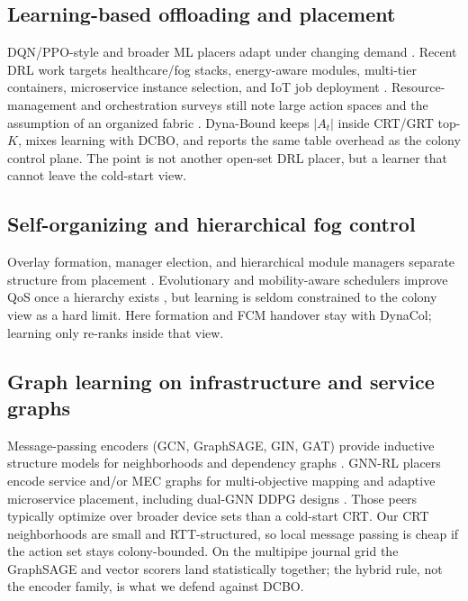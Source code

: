 \documentclass[pdflatex,sn-mathphys-num,iicol]{sn-jnl}
\begin{document}
\subsection{Learning-based offloading and placement}
DQN/PPO-style and broader ML placers adapt under changing demand
\cite{mnih_nature2015_dqn,schulman_ppo2017,supraja_cluster2025_slr,haddadha_aire2024_mlplacement,abdulazeez_access2023_offload}.
Recent DRL work targets healthcare/fog stacks, energy-aware modules, multi-tier
containers, microservice instance selection, and IoT job deployment
\cite{tuli_iotj2020_dynamic,hossam_cluster2024_energy,dogani_cluster2024_twotier,boudieb_fgcs2024_drl,bushehrian_computing2025_drl}.
Resource-management and orchestration surveys still note large action spaces and
the assumption of an organized fabric
\cite{hong_csur2019_resource,costa_csur2022,pallewatta_csur2023_microservices,mahmud_csur2020_appmgmt}.
Dyna-Bound keeps $|A_t|$ inside CRT/GRT top-$K$, mixes learning with DCBO, and
reports the same table overhead as the colony control plane. The point is not
another open-set DRL placer, but a learner that cannot leave the cold-start
view.

\subsection{Self-organizing and hierarchical fog control}
Overlay formation, manager election, and hierarchical module managers separate
structure from placement
\cite{mahmud_fog_application2018,bittencourt_cloudcomp2017_mobility,ouyang_jiot2021_drloffload}.
Evolutionary and mobility-aware schedulers improve QoS once a hierarchy exists
\cite{guerrero_fgcs2019_evolutionary}, but learning is seldom constrained to the
colony view as a hard limit. Here formation and FCM handover stay with DynaCol;
learning only re-ranks inside that view.

\subsection{Graph learning on infrastructure and service graphs}
Message-passing encoders (GCN, GraphSAGE, GIN, GAT) provide inductive structure
models for neighborhoods and dependency graphs
\cite{kipf_gcn_iclr2017,hamilton_graphsage2017,xu_gin_iclr2019,velickovic_gat2018}.
GNN-RL placers encode service and/or MEC graphs for multi-objective mapping and
adaptive microservice placement, including dual-GNN DDPG designs
\cite{lera_jsup2024_gnn,chen_tmc2024_dgddpg}.
Those peers typically optimize over broader device sets than a cold-start CRT.
Our CRT neighborhoods are small and RTT-structured, so local message passing is
cheap if the action set stays colony-bounded. On the multipipe journal grid the
GraphSAGE and vector scorers land statistically together; the hybrid rule, not
the encoder family, is what we defend against DCBO.
\end{document}
